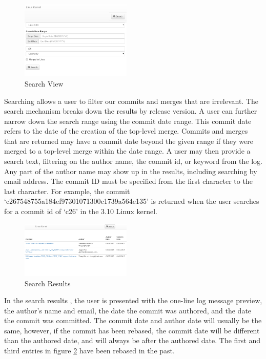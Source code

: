 \documentclass[conference, draftclsnofoot]{IEEEtran}
\begin{document}
\begin{figure}[h]
	\centering
	\includegraphics[width=0.47\textwidth]{figures/search.png}
	\caption{Search View}
	\label{fig:search}
\end{figure}

Searching allows a user to filter our commits and merges that are irrelevant.
The search mechanism breaks down the results by release version. A user can
further narrow down the search range using the commit date range. This commit
date refers to the date of the creation of the top-level merge. Commits and
merges that are returned may have a commit date beyond the given range if they
were merged to a top-level merge within the date range. A user may then provide
a search text, filtering on the author name, the commit id, or keyword from the
log. Any part of the author name may show up in the results, including
searching by email address. The commit ID must be specified from the first
character to the last character. For example, the commit
`c267548755a184ef97301071300c1739a564e135' is returned when the user searches
for a commit id of `c26' in the 3.10 Linux kernel.

\begin{figure}[h]
	\centering
	\includegraphics[width=0.47\textwidth]{figures/search_results.png}
	\caption{Search Results}
	\label{fig:results}
\end{figure}

In the search results , the user is presented with the one-line log message
preview, the author's name and email, the date the commit was authored, and the
date the commit was committed. 
The commit date and author date will usually be the same, however, if the
commit has been rebased, the commit date will be different than the authored
date, and will always be after the authored date. The first and third entries
in figure \ref{fig:results} have been rebased in the past. 
\end{document}
